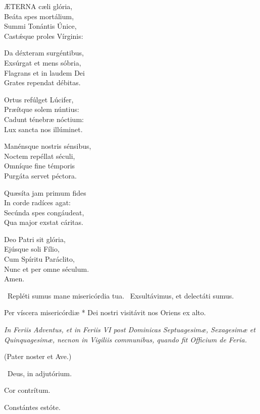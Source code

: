 
\lettrine[lines=2]{Æ}{TERNA} cæli glória,\\
Beáta spes mortálium,\\
Summi Tonántis Únice,\\
Castǽque proles Vírginis:

Da déxteram surgéntibus,\\
Exsúrgat et mens sóbria,\\
Flagrans et in laudem Dei\\
Grates rependat débitas.

Ortus refúlget Lúcifer,\\
Præítque solem núntius:\\
Cadunt ténebræ nóctium:\\
Lux sancta nos illúminet.

Manénsque nostris sénsibus,\\
Noctem repéllat séculi,\\
Omníque fine témporis\\
Purgáta servet péctora.

Quæsíta jam primum fides\\
In corde radíces agat:\\
Secúnda spes congáudeat,\\
Qua major exstat cáritas.

Deo Patri sit glória,\\
Ejúsque soli Fílio,\\
Cum Spíritu Paráclito,\\
Nunc et per omne séculum.\\
Amen.

\V\ Repléti sumus mane misericórdia tua. \R\ Exsultávimus, et delectáti sumus.

 Per víscera misericórdiæ * Dei nostri visitávit nos Oriens ex alto.


\sectionornament


\textit{In Feriis Adventus, et in Feriis VI post Dominicas Septuagesimæ, Sexagesimæ et Quinquagesimæ, necnon in Vigiliis communibus, quando fit Officium de Feria.}

(Pater noster et Ave.)

\V\ Deus, in adjutórium.

 Cor contrítum.

  Constántes estóte.

